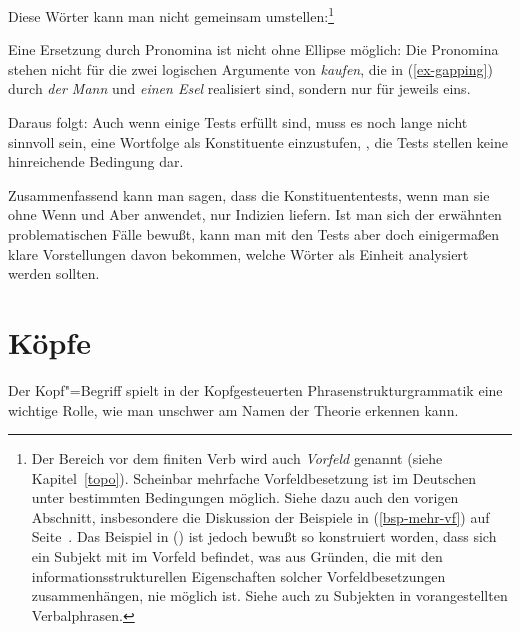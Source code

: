 Diese Wörter kann man nicht gemeinsam umstellen:\footnote{
  Der Bereich vor dem finiten Verb wird auch \emph{Vorfeld} genannt (siehe Kapitel~\ref{topo}).
  Scheinbar mehrfache Vorfeldbesetzung ist im Deutschen unter bestimmten
  Bedingungen möglich. Siehe dazu auch den vorigen Abschnitt, insbesondere
  die Diskussion der Beispiele in (\ref{bsp-mehr-vf}) auf Seite~\pageref{bsp-mehr-vf}.
  Das Beispiel in () ist jedoch bewußt so konstruiert worden, 
  dass sich ein Subjekt mit im Vorfeld befindet, was aus Gründen, die 
  mit den informationsstrukturellen Eigenschaften solcher Vorfeldbesetzungen
  zusammenhängen, nie möglich ist. Siehe auch  zu Subjekten
  in vorangestellten Verbalphrasen.%
}
\z

Eine Ersetzung durch Pronomina ist nicht ohne Ellipse möglich:
\eal
{}
\zl
Die Pronomina stehen nicht für die zwei logischen Argumente von \emph{kaufen}, die
in (\ref{ex-gapping})  \zb durch \emph{der Mann} und \emph{einen Esel} realisiert sind,
sondern nur für jeweils eins.

Daraus folgt: Auch wenn einige Tests erfüllt sind, muss es noch lange nicht sinnvoll sein,
eine Wortfolge als Konstituente einzustufen, \dash, die Tests stellen keine hinreichende
Bedingung dar.



Zusammenfassend kann man sagen, dass die Konstituententests, wenn man sie ohne Wenn und Aber
anwendet, nur Indizien liefern. Ist man sich der erwähnten problematischen Fälle bewußt,
kann man mit den Tests aber doch einigermaßen klare Vorstellungen davon bekommen, welche
Wörter als Einheit analysiert werden sollten.

\section{Köpfe}

Der Kopf"=Begriff spielt in der Kopfgesteuerten Phrasenstrukturgrammatik
eine wichtige Rolle, wie man unschwer am Namen der Theorie erkennen kann.

